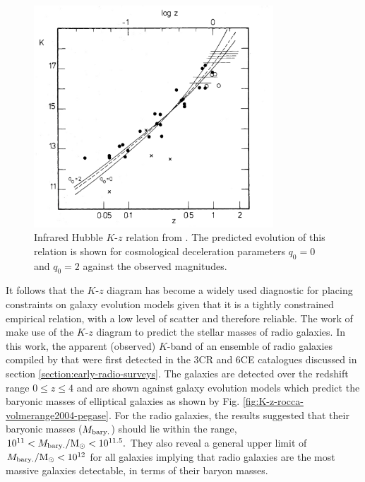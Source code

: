 \documentclass[10pt,a4paper]{article}
\begin{document}
\begin{figure}[!ht]
    \centering
    \includegraphics[width=0.8\textwidth]{plots_chp1/K_z_Lill1982.png}
    \caption[Near-infrared Hubble $K$-$z$ diagram \citep{LillyLongair1982}]{Infrared Hubble $K$-$z$ relation from \citet{LillyLongair1982}. The predicted evolution of this relation is shown for cosmological deceleration parameters $q_0=0$ and $q_0=2$ against the observed magnitudes.}
    \label{fig:K-z-Lilly1984}
\end{figure}

It follows that the $K$-$z$ diagram has become a widely used diagnostic for placing constraints on galaxy evolution models given that it is a tightly constrained empirical relation, with a low level of scatter and therefore reliable. The work of \citet{rocca-volmerange2004} make use of the $K$-$z$ diagram to predict the stellar masses of radio galaxies. In this work, the apparent (observed) $K$-band of an ensemble of radio galaxies compiled by \citet{deBreuck2002} that were first detected in the 3CR and 6CE catalogues discussed in section \ref{section:early-radio-surveys}. The galaxies are detected over the redshift range $0 \leq z \leq 4$ and are shown against galaxy evolution models which predict the baryonic masses of elliptical galaxies as shown by Fig. \ref{fig:K-z-rocca-volmerange2004-pegase}. For the radio galaxies, the results suggested that their baryonic masses ($M_{\rm bary.}$) should lie within the range, $10^{11} < M_{\rm bary.}/\rm{M}_\odot < 10^{11.5}.$ They also reveal a general upper limit of $M_{\rm bary.}/\rm{M}_\odot < 10^{12}$ for all galaxies implying that radio galaxies are the most massive galaxies detectable, in terms of their baryon masses.
\end{document}
